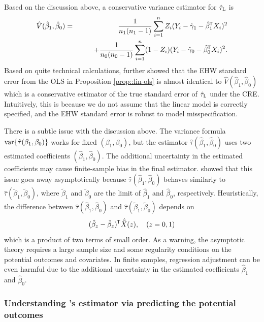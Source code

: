 Based on the discussion above, a conservative variance estimator for $\hat{\tau}_\textsc{L}$ is 
\begin{eqnarray*}
\hat{V}(  \hat{\beta}_1, \hat{\beta}_0 ) 
&=& \frac{1}{n_1(n_1 - 1)} \sum_{i=1}^n Z_i  ( Y_i - \hat{\gamma}_1 - \hat{\beta}_1^{\mkern-1.5mu\mathsf{T}}  X_i  ) ^2 \\
&& \qquad + \frac{1}{n_0(n_0 - 1)} \sum_{i=1}^n (1-Z_i)  ( Y_i - \hat{\gamma}_0 - \hat{\beta}_0^{\mkern-1.5mu\mathsf{T}}  X_i )^2.
\end{eqnarray*}
Based on quite technical calculations, \citet{lin2013} further showed that the EHW standard error from the OLS in Proposition \ref{prop::lin-ols} is almost identical to $\hat{V}(  \hat{\beta}_1, \hat{\beta}_0 ) $ which is a conservative estimator of the true standard error of $\hat{\tau}_\textsc{L}$ under the CRE. Intuitively, this is because we do not assume that the linear model is correctly specified, and the EHW standard error is robust to model misspecification. 



There is a subtle issue with the discussion above. The variance formula $\textup{var}\{ \hat{\tau}(\beta_1, \beta_0) \} $ works for fixed $(\beta_1, \beta_0)$, but the estimator $ \hat{\tau}( \hat{\beta}_1, \hat{\beta}_0) $ uses two estimated coefficients $( \hat{\beta}_1, \hat{\beta}_0) $. The additional uncertainty in the estimated coefficients may cause finite-sample bias in the final estimator. \citet{lin2013} showed that this issue goes away asymptotically because $ \hat{\tau}( \hat{\beta}_1, \hat{\beta}_0) $ behaves similarly to $ \hat{\tau}( \tilde{\beta}_1, \tilde{\beta}_0) $, where $\tilde{\beta}_1$ and $\tilde{\beta}_0$ are the limit of $\hat{\beta}_1$ and $ \hat{\beta}_0$, respectively. Heuristically, the difference between  $ \hat{\tau}( \hat{\beta}_1, \hat{\beta}_0) $ and $ \hat{\tau}( \tilde{\beta}_1, \tilde{\beta}_0) $ depends on 
$$
(\hat{\beta}_z - \tilde{\beta}_z)^{\mkern-1.5mu\mathsf{T}} \hat{\bar{X} }(z) ,\quad (z=0,1) 
$$
which is a product of two terms of small order. As a warning,  the asymptotic theory requires a large sample size and some regularity conditions on the potential outcomes and covariates. In finite samples, regression adjustment can be even harmful due to the additional uncertainty in the estimated coefficients $\hat{\beta}_1$ and $\hat{\beta}_0$. 




\subsubsection{Understanding \citet{lin2013}'s estimator via predicting the potential outcomes}
\label{sec::understand-lin-predict}
 
